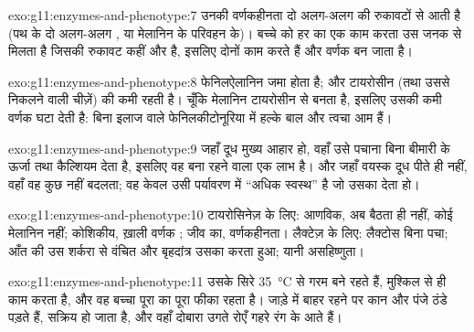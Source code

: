 \begin{solution}{exo:g11:enzymes-and-phenotype:7}
उनकी वर्णकहीनता दो अलग-अलग  की रुकावटों से आती है (पथ के दो अलग-अलग
, या मेलानिन के परिवहन के)। बच्चे को हर  का एक काम करता  उस
जनक से मिलता है जिसकी रुकावट कहीं और है, इसलिए दोनों  काम करते हैं और
वर्णक बन जाता है।
\end{solution}

\begin{solution}{exo:g11:enzymes-and-phenotype:8}
फेनिलऐलानिन जमा होता है; और टायरोसीन (तथा उससे निकलने वाली चीज़ें) की कमी
रहती है। चूँकि मेलानिन टायरोसीन से बनता है, इसलिए उसकी कमी वर्णक घटा देती
है: बिना इलाज वाले फेनिलकीटोनूरिया में हल्के बाल और त्वचा आम हैं।
\end{solution}

\begin{solution}{exo:g11:enzymes-and-phenotype:9}
जहाँ दूध मुख्य आहार हो, वहाँ उसे पचाना बिना बीमारी के ऊर्जा तथा कैल्शियम
देता है, इसलिए वह बना रहने वाला  एक लाभ है। और जहाँ वयस्क दूध पीते
ही नहीं, वहाँ वह  कुछ नहीं बदलता; वह केवल उसी पर्यावरण में ``अधिक
स्वस्थ'' है जो उसका  देता हो।
\end{solution}

\begin{solution}{exo:g11:enzymes-and-phenotype:10}
टायरोसिनेज़ के लिए: आणविक,  अब बैठता ही नहीं, कोई मेलानिन नहीं;
कोशिकीय, ख़ाली वर्णक ; जीव का, वर्णकहीनता। लैक्टेज़ के लिए:
लैक्टोस बिना पचा; आँत की  उस शर्करा से वंचित और बृहदांत्र उसका
 करता हुआ; यानी असहिष्णुता।
\end{solution}

\begin{solution}{exo:g11:enzymes-and-phenotype:11}
उसके सिरे \qty{35}{\celsius} से गरम बने रहते हैं,  मुश्किल से ही काम
करता है, और वह बच्चा पूरा का पूरा फीका रहता है। जाड़े में बाहर रहने पर कान
और पंजे ठंडे पड़ते हैं,  सक्रिय हो जाता है, और वहाँ दोबारा उगते रोएँ
गहरे रंग के आते हैं।
\end{solution}

